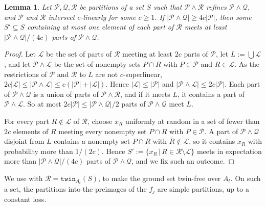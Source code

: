\documentclass[11pt]{article}
\newtheorem{lemma}[theorem]{Lemma}
\theoremstyle{definition}
\renewcommand{\le}{\leqslant}
\renewcommand{\ge}{\geqslant}
\newcommand{\set}[1]{\{#1\}}
\newcommand{\setof}[2]{\set{#1 \,|\, #2 }}
\newcommand{\Pp}{\mathcal{P}}
\newcommand{\Qq}{\mathcal{Q}}
\newcommand{\twin}{\mathtt{twin}}
\begin{document}
\begin{lemma}\label{lem:3-partitions}
Let $\Pp, \Qq, \mathcal R$ be partitions of a set $S$ such that $\Pp \wedge \mathcal R$ refines $\Pp \wedge \Qq$, and $\Pp$ and $\mathcal R$ intersect $c$-linearly for some $c \ge 1$.
If $|\Pp \wedge \Qq| \ge 4c|\Pp|$, then some $S' \subseteq S$ containing at most one element of each part of $\mathcal R$ meets at least $|\Pp \wedge \Qq| / (4c)$ parts of $\Pp \wedge \Qq$.
\end{lemma}
\begin{proof}
Let $\mathcal L$ be the set of parts of $\mathcal R$ meeting at least $2c$ parts of $\Pp$, let $L := \bigcup \mathcal L$, and let $\Pp \wedge \mathcal L$ be the set of nonempty sets $P \cap R$ with $P \in \Pp$ and $R \in \mathcal L$.
As the restrictions of $\Pp$ and $\mathcal R$ to $L$ are not $c$-superlinear, $2c|\mathcal L| \le |\Pp \wedge \mathcal L| \le c(|\Pp| + |\mathcal L|)$.
Hence $|\mathcal L| \le |\Pp|$ and $|\Pp \wedge \mathcal L| \le 2c|\Pp|$.
Each part of $\Pp \wedge \Qq$ is a union of parts of $\Pp \wedge \mathcal R$, and if it meets $L$, it contains a part of $\Pp \wedge \mathcal L$.
So at most $2c|\Pp| \le |\Pp \wedge \Qq|/2$ parts of $\Pp \wedge \Qq$ meet $L$.

For every part $R \notin \mathcal L$ of $\mathcal R$, choose $x_R$ uniformly at random in a set of fewer than $2c$ elements of $R$ meeting every nonempty set $P \cap R$ with $P \in \Pp$.
A part of $\Pp \wedge \Qq$ disjoint from $L$ contains a nonempty set $P \cap R$ with $R \notin \mathcal L$, so it contains $x_R$ with probability more than $1/(2c)$.
Hence $S' := \setof{x_R}{R \in \mathcal R \setminus \mathcal L}$ meets in expectation more than $|\Pp \wedge \Qq|/(4c)$ parts of $\Pp \wedge \Qq$, and we fix such an outcome.
\end{proof}

We use  with $\mathcal R = \twin_{A_t}(S)$, to make the ground set twin-free over $A_t$.
On such a set, the partitions into the preimages of the $f_j$ are simple partitions, up to a constant loss.
\end{document}
